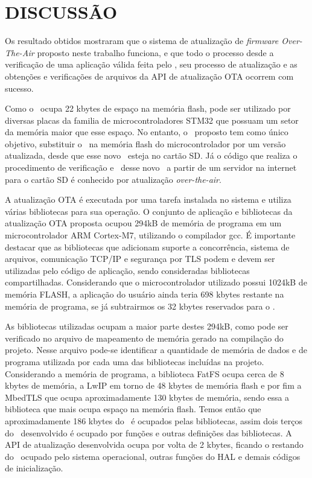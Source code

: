\section{DISCUSSÃO}
Os resultado obtidos mostraram que o sistema de atualização de \textit{firmware Over-The-Air} proposto neste trabalho funciona, e que todo o processo desde a verificação de uma aplicação válida feita pelo \bootloader, seu processo de atualização e as obtenções e verificações de arquivos da API de atualização OTA ocorrem com sucesso.

Como o \bootloader\ ocupa 22 kbytes de espaço na memória flash, pode ser utilizado por diversas placas da familia de microcontroladores STM32 que possuam um setor da memória maior que esse espaço.
No entanto, o \bootloader\ proposto tem como único objetivo, substituir o \firmware\ na memória flash do microcontrolador por um versão atualizada, desde que esse novo \firmware\ esteja no cartão SD. Já o código que realiza o procedimento de verificação e \download\ desse novo \firmware\ a partir de um servidor na internet para o cartão SD é conhecido por atualização \textit{over-the-air}. 

A atualização OTA é executada por uma tarefa instalada no sistema e utiliza várias bibliotecas para sua operação. O conjunto de aplicação e bibliotecas da atualização OTA proposta ocupou 294kB de memória de programa em um microcontrolador ARM Cortex-M7, utilizando o compilador gcc. É importante destacar que as bibliotecas que adicionam suporte a concorrência, sistema de arquivos, comunicação TCP/IP e segurança por TLS podem e devem ser utilizadas pelo código de aplicação, sendo consideradas bibliotecas compartilhadas.
Considerando que o microcontrolador utilizado possui 1024kB de memória FLASH, a aplicação do usuário ainda teria 698 kbytes restante na memória de programa, se já subtrairmos os 32 kbytes reservados para o \bootloader. 


As bibliotecas utilizadas ocupam a maior parte destes 294kB, como pode ser verificado no arquivo de mapeamento de memória gerado na compilação do projeto. Nesse arquivo pode-se identificar a quantidade de memória de dados e de programa utilizada por cada uma das bibliotecas incluídas na projeto. Considerando a memória de programa, a biblioteca FatFS ocupa cerca de 8 kbytes de memória, a LwIP em torno de 48 kbytes de memória flash e por fim a MbedTLS que ocupa aproximadamente 130 kbytes de memória, sendo essa a biblioteca que mais ocupa espaço na memória flash. Temos então que aproximadamente 186 kbytes do \firmware\ é ocupados pelas bibliotecas, assim dois terços do \firmware\ desenvolvido é ocupado por funções e outras definições das bibliotecas. A API de atualização desenvolvida ocupa por volta de 2 kbytes, ficando o restando do \firmware\ ocupado pelo sistema operacional, outras funções do HAL e demais códigos de inicialização.

